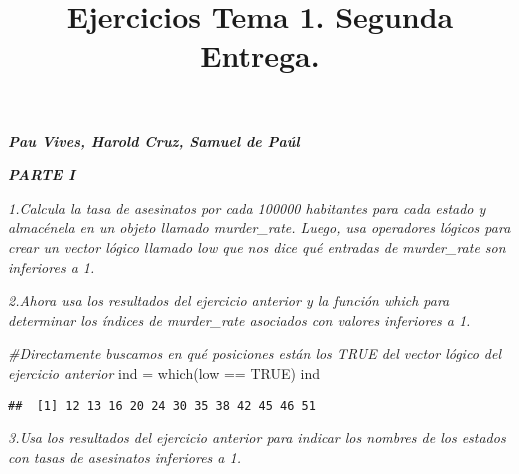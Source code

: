 \documentclass[
]{article}
\title{Ejercicios Tema 1. Segunda Entrega.}
\author{}
\date{\vspace{-2.5em}}
\newenvironment{Shaded}{\begin{snugshade}}{\end{snugshade}}
\newcommand{\CommentTok}[1]{\textcolor[rgb]{0.56,0.35,0.01}{\textit{#1}}}
\newcommand{\ConstantTok}[1]{\textcolor[rgb]{0.00,0.00,0.00}{#1}}
\newcommand{\DecValTok}[1]{\textcolor[rgb]{0.00,0.00,0.81}{#1}}
\newcommand{\FunctionTok}[1]{\textcolor[rgb]{0.00,0.00,0.00}{#1}}
\newcommand{\NormalTok}[1]{#1}
\newcommand{\OtherTok}[1]{\textcolor[rgb]{0.56,0.35,0.01}{#1}}
\newcommand{\SpecialCharTok}[1]{\textcolor[rgb]{0.00,0.00,0.00}{#1}}
\begin{document}
\maketitle

\textbf{\emph{Pau Vives, Harold Cruz, Samuel de Paúl}}

\textbf{\emph{PARTE I}}

\emph{1.Calcula la tasa de asesinatos por cada 100000 habitantes para
cada estado y almacénela en un objeto llamado murder\_rate. Luego, usa
operadores lógicos para crear un vector lógico llamado low que nos dice
qué entradas de murder\_rate son inferiores a 1.}

\begin{Shaded}
\end{Shaded}

\emph{2.Ahora usa los resultados del ejercicio anterior y la función
which para determinar los índices de murder\_rate asociados con valores
inferiores a 1.}

\begin{Shaded}
\begin{Highlighting}[]
\CommentTok{\#Directamente buscamos en qué posiciones están los TRUE del vector lógico del ejercicio anterior}
\NormalTok{ind }\OtherTok{=} \FunctionTok{which}\NormalTok{(low }\SpecialCharTok{==} \ConstantTok{TRUE}\NormalTok{)}
\NormalTok{ind}
\end{Highlighting}
\end{Shaded}

\begin{verbatim}
##  [1] 12 13 16 20 24 30 35 38 42 45 46 51
\end{verbatim}

\emph{3.Usa los resultados del ejercicio anterior para indicar los
nombres de los estados con tasas de asesinatos inferiores a 1.}

\begin{Shaded}
\end{Shaded}
\end{document}
